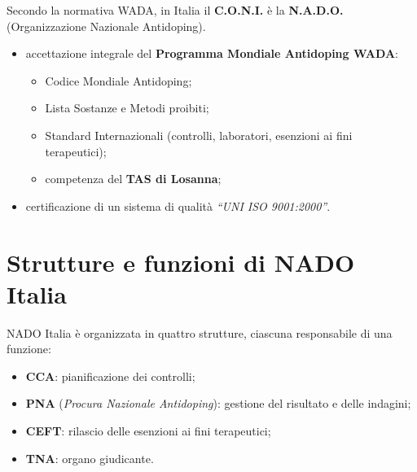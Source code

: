 Secondo la normativa WADA, in Italia il \textbf{C.O.N.I.} è la \textbf{N.A.D.O.} (Organizzazione
Nazionale Antidoping).

\begin{itemize}
  \item accettazione integrale del \textbf{Programma Mondiale Antidoping WADA}:
    \begin{itemize}
      \item Codice Mondiale Antidoping;
      \item Lista Sostanze e Metodi proibiti;
      \item Standard Internazionali (controlli, laboratori, esenzioni ai fini terapeutici);
      \item competenza del \textbf{TAS di Losanna};
    \end{itemize}
  \item certificazione di un sistema di qualità \textit{``UNI ISO 9001:2000''}.
\end{itemize}

\section{Strutture e funzioni di NADO Italia}

NADO Italia è organizzata in quattro strutture, ciascuna responsabile di una funzione:
\begin{itemize}
  \item \textbf{CCA}: pianificazione dei controlli;
  \item \textbf{PNA} (\textit{Procura Nazionale Antidoping}): gestione del risultato e delle
    indagini;
  \item \textbf{CEFT}: rilascio delle esenzioni ai fini terapeutici;
  \item \textbf{TNA}: organo giudicante.
\end{itemize}

